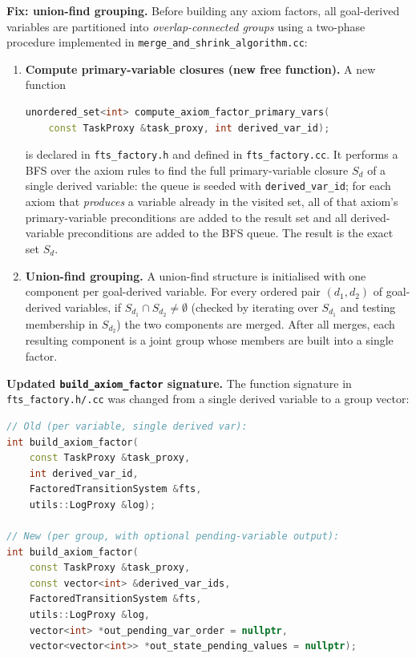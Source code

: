 \documentclass[11pt,a4paper]{article}
\begin{document}
    \textbf{Fix: union-find grouping.}
    Before building any axiom factors, all goal-derived variables are
    partitioned into \emph{overlap-connected groups} using a two-phase
    procedure implemented in \texttt{merge\_and\_shrink\_algorithm.cc}:

    \begin{enumerate}
      \item \textbf{Compute primary-variable closures (new free function).}
        A new function
\begin{lstlisting}[language=C++]
unordered_set<int> compute_axiom_factor_primary_vars(
    const TaskProxy &task_proxy, int derived_var_id);
\end{lstlisting}
        is declared in \texttt{fts\_factory.h} and defined in
        \texttt{fts\_factory.cc}.  It performs a BFS over the axiom rules
        to find the full primary-variable closure $S_d$ of a single derived
        variable: the queue is seeded with \texttt{derived\_var\_id}; for
        each axiom that \emph{produces} a variable already in the visited
        set, all of that axiom's primary-variable preconditions are added
        to the result set and all derived-variable preconditions are added
        to the BFS queue.  The result is the exact set $S_d$.

      \item \textbf{Union-find grouping.}
        A union-find structure is initialised with one component per
        goal-derived variable.  For every ordered pair $(d_1, d_2)$ of
        goal-derived variables, if $S_{d_1} \cap S_{d_2} \neq \emptyset$
        (checked by iterating over $S_{d_1}$ and testing membership in
        $S_{d_2}$) the two components are merged.  After all merges,
        each resulting component is a joint group whose members are built
        into a single factor.
    \end{enumerate}

    \textbf{Updated \texttt{build\_axiom\_factor} signature.}
    The function signature in \texttt{fts\_factory.h/.cc} was changed from a
    single derived variable to a group vector:
\begin{lstlisting}[language=C++]
// Old (per variable, single derived var):
int build_axiom_factor(
    const TaskProxy &task_proxy,
    int derived_var_id,
    FactoredTransitionSystem &fts,
    utils::LogProxy &log);

// New (per group, with optional pending-variable output):
int build_axiom_factor(
    const TaskProxy &task_proxy,
    const vector<int> &derived_var_ids,
    FactoredTransitionSystem &fts,
    utils::LogProxy &log,
    vector<int> *out_pending_var_order = nullptr,
    vector<vector<int>> *out_state_pending_values = nullptr);
\end{lstlisting}
\end{document}
